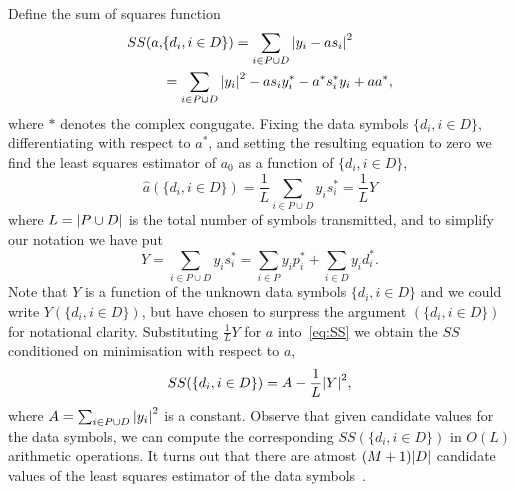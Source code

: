 \documentclass[journal]{IEEEtran}
\begin{document}
Define the sum of squares function
\begin{align}
SS(a, &\{d_i, i \in D\}) = \sum_{i \in P \cup D} {\left\vert  y_i - a s_i  \right\vert}^2 \nonumber \\
&= \sum_{i \in P \cup D} {\left\vert y_i \right\vert}^2 - a s_i y_i^* - a^* s_i^* y_i + aa^*, \label{eq:SS}
\end{align}
where $*$ denotes the complex congugate.  Fixing the data symbols $\{d_i, i \in D\}$, differentiating with respect to $a^*$, and setting the resulting equation to zero we find the least squares estimator of $a_0$ as a function of $\{d_i, i \in D\}$,
\begin{equation}\label{eq:hata}
\hat{a}(\{d_i, i \in D\}) = \frac{1}{L} \sum_{i \in P \cup D} y_i s_i^* = \frac{1}{L} Y
\end{equation}
where $L = {\left\vert P \cup D \right\vert}$ is the total number of symbols transmitted, and to simplify our notation we have put 
\[
Y = \sum_{i \in P \cup D} y_i s_i^* = \sum_{i \in P } y_i p_i^* + \sum_{i \in D } y_i d_i^*.
\]  
Note that $Y$ is a function of the unknown data symbols $\{ d_i, i \in D\}$ and we could write $Y(\{ d_i, i \in D\})$, but have chosen to surpress the argument $(\{ d_i, i \in D\})$ for notational clarity.  Substituting $\frac{1}{L}Y$ for $a$ into~\eqref{eq:SS} we obtain the $SS$ conditioned on minimisation with respect to $a$,
\begin{equation}\label{eq:SSdatasymbols}
SS(\{d_i, i \in D\}) = A - \frac{1}{L}{\left\vert Y \right\vert}^2,
\end{equation}
where $A = \sum_{i \in P \cup D}{\left\vert y_i \right\vert}^2$ is a constant.  Observe that given candidate values for the data symbols, we can compute the corresponding $SS(\{d_i, i \in D\})$ in $O(L)$ arithmetic operations.  It turns out that there are atmost $(M+1){\left\vert D \right\vert}$ candidate values of the least squares estimator of the data symbols~\cite{Sweldens2001,Mackenthun1994}.  %
\end{document}

